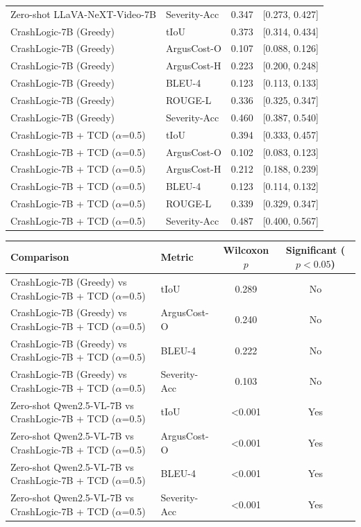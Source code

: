 \begin{tabular}{l l c c}
Zero-shot LLaVA-NeXT-Video-7B & Severity-Acc & 0.347 & [0.273, 0.427] \\
CrashLogic-7B (Greedy) & tIoU & 0.373 & [0.314, 0.434] \\
CrashLogic-7B (Greedy) & ArgusCost-O & 0.107 & [0.088, 0.126] \\
CrashLogic-7B (Greedy) & ArgusCost-H & 0.223 & [0.200, 0.248] \\
CrashLogic-7B (Greedy) & BLEU-4 & 0.123 & [0.113, 0.133] \\
CrashLogic-7B (Greedy) & ROUGE-L & 0.336 & [0.325, 0.347] \\
CrashLogic-7B (Greedy) & Severity-Acc & 0.460 & [0.387, 0.540] \\
CrashLogic-7B + TCD ($\alpha$=0.5) & tIoU & 0.394 & [0.333, 0.457] \\
CrashLogic-7B + TCD ($\alpha$=0.5) & ArgusCost-O & 0.102 & [0.083, 0.123] \\
CrashLogic-7B + TCD ($\alpha$=0.5) & ArgusCost-H & 0.212 & [0.188, 0.239] \\
CrashLogic-7B + TCD ($\alpha$=0.5) & BLEU-4 & 0.123 & [0.114, 0.132] \\
CrashLogic-7B + TCD ($\alpha$=0.5) & ROUGE-L & 0.339 & [0.329, 0.347] \\
CrashLogic-7B + TCD ($\alpha$=0.5) & Severity-Acc & 0.487 & [0.400, 0.567] \\
\bottomrule
\end{tabular}


\begin{tabular}{l l c c}
\toprule
Comparison & Metric & Wilcoxon $p$ & Significant ($p<0.05$) \\
\midrule
CrashLogic-7B (Greedy) vs CrashLogic-7B + TCD ($\alpha$=0.5) & tIoU & 0.289 & No \\
CrashLogic-7B (Greedy) vs CrashLogic-7B + TCD ($\alpha$=0.5) & ArgusCost-O & 0.240 & No \\
CrashLogic-7B (Greedy) vs CrashLogic-7B + TCD ($\alpha$=0.5) & BLEU-4 & 0.222 & No \\
CrashLogic-7B (Greedy) vs CrashLogic-7B + TCD ($\alpha$=0.5) & Severity-Acc & 0.103 & No \\
Zero-shot Qwen2.5-VL-7B vs CrashLogic-7B + TCD ($\alpha$=0.5) & tIoU & <0.001 & Yes \\
Zero-shot Qwen2.5-VL-7B vs CrashLogic-7B + TCD ($\alpha$=0.5) & ArgusCost-O & <0.001 & Yes \\
Zero-shot Qwen2.5-VL-7B vs CrashLogic-7B + TCD ($\alpha$=0.5) & BLEU-4 & <0.001 & Yes \\
Zero-shot Qwen2.5-VL-7B vs CrashLogic-7B + TCD ($\alpha$=0.5) & Severity-Acc & <0.001 & Yes \\
\bottomrule
\end{tabular}

